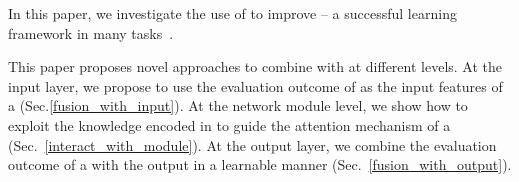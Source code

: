 
In this paper, we investigate the use of \REs to improve \NNs -- a successful learning framework in many \NLP
tasks~\cite{goldberg2017neural}. 




This paper proposes novel approaches to combine \REs with \NNs at different levels.  At the input layer, we propose to use the evaluation
outcome of \REs as the input features of a \NN (Sec.\ref{fusion_with_input}).
At the network module level, we show how to
exploit the knowledge encoded in \REs to guide the attention mechanism of a \NN (Sec.~\ref{interact_with_module}). At the output layer, we
combine the evaluation outcome of a \RE with the \NN output in a learnable manner (Sec.~\ref{fusion_with_output}).

